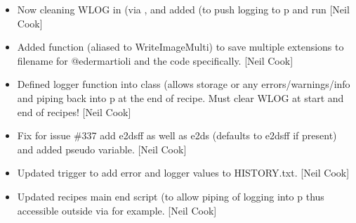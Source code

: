\documentclass[a4paper,10pt,english]{report}
\begin{document}
\begin{itemize}
\item {} 
Now cleaning WLOG in  (via , and added
 (to push logging to p and run  {[}Neil Cook{]}

\item {} 
Added function  (aliased to WriteImageMulti) to save
multiple extensions to filename \sphinxhyphen{} for @edermartioli and the 
code specifically. {[}Neil Cook{]}

\item {} 
Defined logger function into class (allows storage or any
errors/warnings/info and piping back into p at the end of recipe. Must
clear WLOG at start and end of recipes! {[}Neil Cook{]}

\item {} 
Fix for issue \#337 \sphinxhyphen{} add e2dsff as well as e2ds (defaults to e2dsff if
present) and added  pseudo variable. {[}Neil Cook{]}

\item {} 
Updated trigger to add error and logger values to HISTORY.txt. {[}Neil
Cook{]}

\item {} 
Updated recipes main end script (to allow piping of logging into p \sphinxhyphen{}
thus accessible outside via  for example.
{[}Neil Cook{]}

\end{itemize}
\end{document}
